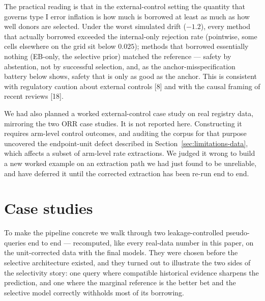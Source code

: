 \documentclass[11pt]{article}
\begin{document}
The practical reading is that in the external-control setting the quantity that
governs type I error inflation is how much is borrowed at least as much as how
well donors are selected. Under the worst simulated drift ($-1.2$), every
method that actually borrowed exceeded the internal-only rejection rate
(pointwise, some cells elsewhere on the grid sit below $0.025$); methods that
borrowed essentially nothing (EB-only, the selective prior) matched the
reference --- safety by abstention, not by successful selection, and, as the
anchor-misspecification battery below shows, safety that is only as good as
the anchor. This is consistent with regulatory caution about external
controls [8] and with the causal framing of recent reviews [18].

We had also planned a worked external-control case study on real registry data,
mirroring the two ORR case studies. It is not reported here. Constructing it
requires arm-level control outcomes, and auditing the corpus for that purpose
uncovered the endpoint-unit defect described in
Section~\ref{sec:limitations-data}, which affects a subset of arm-level rate
extractions. We judged it wrong to build a new worked example on an extraction
path we had just found to be unreliable, and have deferred it until the
corrected extraction has been re-run end to end.


\section{Case studies}
\label{sec:casestudies}
To make the pipeline concrete we walk through two leakage-controlled
pseudo-queries end to end --- recomputed, like every real-data number in this
paper, on the unit-corrected data with the final models. They were chosen
before the selective architecture existed, and they turned out to illustrate
the two sides of the selectivity story: one query where compatible historical
evidence sharpens the prediction, and one where the marginal reference is the
better bet and the selective model correctly withholds most of its borrowing.
\end{document}
